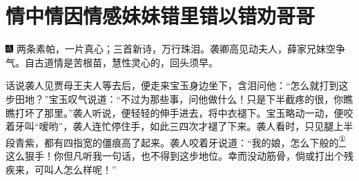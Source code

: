 

\chapter{情中情因情感妹妹\hspace{.5em}错里错以错劝哥哥}

{\includegraphics[width=3mm]{../Images/00005}  \kaishu 两条素帕，一片真心；三首新诗，万行珠泪。袭卿高见动夫人，薛家兄妹空争气。自古道情是苦根苗，慧性灵心的，回头须早。}

话说袭人见贾母王夫人等去后，便走来宝玉身边坐下，含泪问他：``怎么就打到这步田地？''宝玉叹气说道：``不过为那些事，问他做什么！只是下半截疼的很，你瞧瞧打坏了那里。''袭人听说，便轻轻的伸手进去，将中衣褪下。宝玉略动一动，便咬着牙叫``嗳哟''，袭人连忙停住手，如此三四次才褪了下来。袭人看时，只见腿上半段青紫，都有四指宽的僵痕高了起来。袭人咬着牙说道：``我的娘，怎么下般的\href{../Text/part0038_split_000.html\#lnkback_1_a}{\textsuperscript{①}}这么狠手！你但凡听我一句话，也不得到这步地位。幸而没动筋骨，倘或打出个残疾来，可叫人怎么样呢！''

